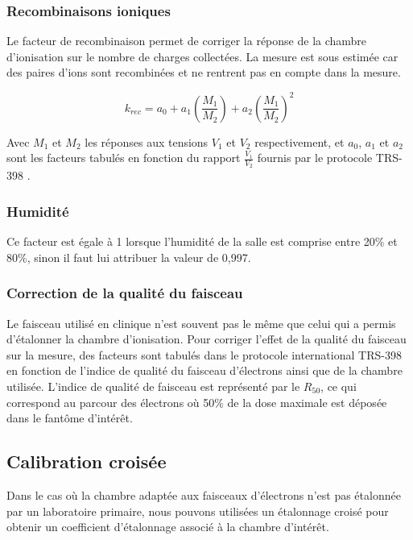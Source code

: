 \documentclass{article}
\begin{document}
\subsubsection{Recombinaisons ioniques}

Le facteur de recombinaison permet de corriger la réponse de la chambre d'ionisation sur le nombre de charges collectées. La mesure est sous estimée car des paires d'ions sont recombinées et ne rentrent pas en compte dans la mesure.

\begin{equation}
  k_{rec} = a_0 + a_1 \left(\dfrac{M_1}{M_2}\right) + a_2 \left(\dfrac{M_1}{M_2}\right) ^2
  \label{eq_rec}
\end{equation}

Avec $M_1$ et $M_2$ les réponses aux tensions $V_1$ et $V_2$ respectivement, et $a_0$, $a_1$ et $a_2$ sont les facteurs tabulés en fonction du rapport $\frac{V_1}{V_2}$ fournis par le protocole TRS-398 \cite{international2001iaea}.

\subsubsection{Humidité}

Ce facteur est égale à 1 lorsque l'humidité de la salle est comprise entre 20\% et 80\%, sinon il faut lui attribuer la valeur de 0,997.

\subsubsection{Correction de la qualité du faisceau}

Le faisceau utilisé en clinique n'est souvent pas le même que celui qui a permis d'étalonner la chambre d'ionisation. Pour corriger l'effet de la qualité du faisceau sur la mesure, des facteurs sont tabulés dans le protocole international TRS-398 en fonction de l'indice de qualité du faisceau d'électrons ainsi que de la chambre utilisée. L'indice de qualité de faisceau est représenté par le $R_{50}$, ce qui correspond au parcour des électrons où 50\% de la dose maximale est déposée dans le fantôme d'intérêt.

\subsection{Calibration croisée}

Dans le cas où la chambre adaptée aux faisceaux d'électrons n'est pas étalonnée par un laboratoire primaire, nous pouvons utilisées un étalonnage croisé pour obtenir un coefficient d'étalonnage associé à la chambre d'intérêt.
\end{document}
